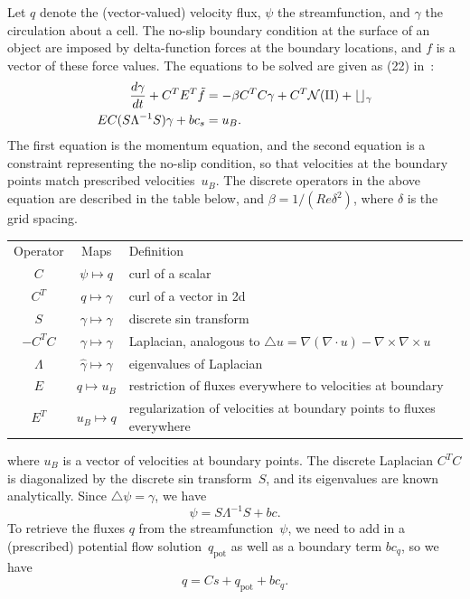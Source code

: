 \documentclass[11pt]{article}
\begin{document}
Let $q$ denote the (vector-valued) velocity flux, $\psi$ the streamfunction, and $\gamma$ the circulation about a cell.  The no-slip boundary condition at the surface of an object are imposed by delta-function forces at the boundary locations, and $f$ is a vector of these force values.  The equations to be solved are given as (22) in~\cite{ColTai-07}:
\begin{align}
	\frac{d\gamma}{dt} + C^TE^T\tilde f &= -\beta C^TC\gamma + C^T\cal{N}(q) + bc_\gamma
	\label{eq:navier_stokes}\\
EC(S\Lambda^{-1}S)\gamma + bc_s &= u_B.
\label{eq:no_slip}
\end{align}
The first equation is the momentum equation, and the second equation is a constraint representing the no-slip condition, so that velocities at the boundary points match prescribed velocities~$u_B$. The discrete operators in the above equation are described in the table below, and $\beta=1/(Re\delta^2)$, where $\delta$ is the grid spacing.  \begin{center}
\begin{tabular}{ccp{3.5in}}
Operator & Maps & Definition\\
$C$ 	& $\psi\mapsto q$ & curl of a scalar\\
$C^T$ 	& $q\mapsto \gamma$ & curl of a vector in 2d\\
$S$ 	& $\gamma\mapsto\hat\gamma$ & discrete sin transform\\
$-C^TC$	& $\gamma\mapsto\gamma$ & Laplacian, analogous to $\triangle u = \nabla(\nabla\cdot u) - \nabla\times\nabla\times u$\\
$\Lambda$	& $\hat\gamma\mapsto\hat\gamma$ & eigenvalues of Laplacian\\
$E$ 	& $q\mapsto u_B$ & restriction of fluxes everywhere to velocities at boundary\\
$E^T$	& $u_B\mapsto q$ & regularization of velocities at boundary points to fluxes everywhere
\end{tabular}
\end{center}
where $u_B$ is a vector of velocities at boundary points.  The discrete Laplacian $C^TC$ is diagonalized by the discrete sin transform~$S$, and its eigenvalues are known analytically.  Since $\triangle\psi =\gamma$, we have
\begin{equation}
	\psi = S\Lambda^{-1}S + bc.
\end{equation}
To retrieve the fluxes $q$ from the streamfunction~$\psi$, we need to add in a (prescribed) potential flow solution~$q_\text{pot}$ as well as a boundary term $bc_q$, so we have
\begin{equation}
	q = Cs + q_\text{pot} + bc_q.
\end{equation}
\end{document}

